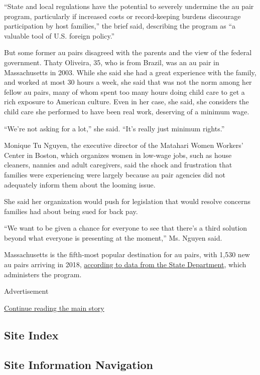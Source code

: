 ``State and local regulations have the potential to severely undermine
the au pair program, particularly if increased costs or record-keeping
burdens discourage participation by host families,'' the brief said,
describing the program as ``a valuable tool of U.S. foreign policy.''

But some former au pairs disagreed with the parents and the view of the
federal government. Thaty Oliveira, 35, who is from Brazil, was an au
pair in Massachusetts in 2003. While she said she had a great experience
with the family, and worked at most 30 hours a week, she said that was
not the norm among her fellow au pairs, many of whom spent too many
hours doing child care to get a rich exposure to American culture. Even
in her case, she said, she considers the child care she performed to
have been real work, deserving of a minimum wage.

``We're not asking for a lot,'' she said. ``It's really just minimum
rights.''

Monique Tu Nguyen, the executive director of the Matahari Women Workers'
Center in Boston, which organizes women in low-wage jobs, such as house
cleaners, nannies and adult caregivers, said the shock and frustration
that families were experiencing were largely because au pair agencies
did not adequately inform them about the looming issue.

She said her organization would push for legislation that would resolve
concerns families had about being sued for back pay.

``We want to be given a chance for everyone to see that there's a third
solution beyond what everyone is presenting at the moment,'' Ms. Nguyen
said.

Massachusetts is the fifth-most popular destination for au pairs, with
1,530 new au pairs arriving in 2018,
\href{https://j1visa.state.gov/wp-content/uploads/2019/03/Au-Pair-Flyer-2018-web.pdf}{according
to data from the State Department}, which administers the program.

Advertisement

\protect\hyperlink{after-bottom}{Continue reading the main story}

\hypertarget{site-index}{%
\subsection{Site Index}\label{site-index}}

\hypertarget{site-information-navigation}{%
\subsection{Site Information
Navigation}\label{site-information-navigation}}


